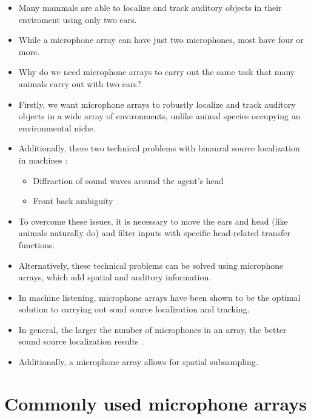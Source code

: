 \documentclass[14pt, legalpaper]{extarticle}
\begin{document}
\begin{itemize}

\item Many mammals are able to localize and track auditory objects in their enviroment using only two ears.

\item While a microphone array can have just two microphones, most have four or more. 

\item Why do we need microphone arrays to carry out the same task that many animals carry out with two ears?

\item Firstly, we want microphone arrays to robustly localize and track auditory objects in a wide array of environments, unlike animal species occupying an environmental niche.

\item Additionally, there two technical problems with binaural source localization in machines \cite{kim2015improved}:
	\begin{itemize}
	\item Diffraction of sound waves around the agent's head
	\item Front back ambiguity
	\end{itemize}

\item To overcome these issues, it is necessary to move the ears and head (like animals naturally do) and filter inputs with specific head-related transfer functions.

\item Alternatively, these technical problems can be solved using microphone arrays, which add spatial and auditory information. 

\item In machine listening, microphone arrays have been shown to be the optimal solution to carrying out sond source localization and tracking.

\item In general, the larger the number of microphones in an array, the better sound source localization results \cite{valin2007robust}.

\item Additionally, a microphone array allows for spatial subsampling.

\end{itemize}

\section{Commonly used microphone arrays}
\end{document}
